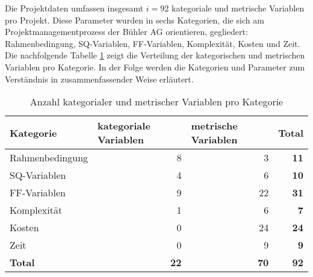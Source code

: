 \newline\newline
Die Projektdaten umfassen insgesamt $i = 92$ kategoriale und metrische Variablen pro Projekt. Diese Parameter wurden in sechs Kategorien, die sich am Projektmanagementprozess der Bühler AG orientieren, gegliedert: Rahmenbedingung, SQ-Variablen, FF-Variablen, Komplexität, Kosten und Zeit. Die nachfolgende Tabelle \ref{tab:katmet} zeigt die Verteilung der kategorischen und metrischen Variablen pro Kategorie. In der Folge werden die Kategorien und Parameter zum Verständnis in zusammenfassender Weise erläutert.
\begin{table}[H]
	\centering
	\caption{Anzahl kategorialer und metrischer Variablen pro Kategorie}
	\begin{tabular}{lrr|r}
		\toprule
		Kategorie & \multicolumn{1}{l}{kategoriale Variablen} & \multicolumn{1}{l}{metrische Variablen} & \multicolumn{1}{l}{\textbf{Total}} \\
		\midrule
		Rahmenbedingung & 8     & 3     & \textbf{11} \\
		SQ-Variablen & 4     & 6     & \textbf{10} \\
		FF-Variablen & 9    & 22    & \textbf{31} \\
		Komplexität & 1     & 6     & \textbf{7} \\
		Kosten  & 0     & 24    & \textbf{24} \\
		Zeit  & 0     & 9     & \textbf{9} \\
		\bottomrule
		\textbf{Total} & \textbf{22} & \textbf{70} & \textbf{92} \\
	\end{tabular}%
	\label{tab:katmet}%
\end{table}%
